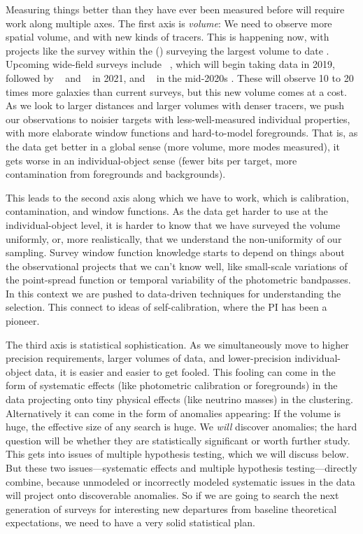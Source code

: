 \documentclass[12pt, fullpage, letterpaper]{article}
\begin{document}
Measuring things better than they have ever been measured before will require work along
multiple axes.
The first axis is \emph{volume}: We need to observe more spatial volume, and with new kinds
of tracers.
This is happening now, with projects like the
 survey within the  (\SDSSIV) surveying the largest volume to date
\citep{Dawson2015}.
Upcoming wide-field surveys include \DESI\ 
\citep{Aghamousa2016}, which will begin taking data in 2019, followed
by \NASA\ \project{Euclid} \citep{Amiaux2012} and
\LSST\ \citep{Ivezic2018} in 2021, and \NASA\  in the mid-2020s
\citep{Akeson2019}.
These will observe 10 to 20 times more galaxies than current surveys,
but this new volume comes at a cost. As we look to larger
distances and larger volumes with denser tracers, we push our
observations to noisier targets with less-well-measured individual
properties, with more elaborate window functions and hard-to-model foregrounds.
That is, as the data get better in a global sense (more volume, more
modes measured), it gets worse in an individual-object sense (fewer
bits per target, more contamination from foregrounds and backgrounds).

This leads to the second axis along which we have to work, which
is calibration, contamination, and window functions.
As the data get harder to use at the individual-object level, it is
harder to know that we have surveyed the volume uniformly, or, more
realistically, that we understand the non-uniformity of our sampling.
Survey window function knowledge starts to depend on things about the
observational projects that we can't know well, like small-scale
variations of the point-spread function or temporal variability of the
photometric bandpasses.
In this context we are pushed to data-driven techniques for
understanding the selection.
This connect to ideas of
self-calibration, where the PI has been a pioneer.

The third axis is statistical sophistication.
As we simultaneously move to higher precision requirements, larger
volumes of data, and lower-precision individual-object data, it is 
easier and easier to get fooled.
This fooling can come in the form of systematic effects (like
photometric calibration or foregrounds) in the data projecting onto
tiny physical effects (like neutrino masses) in the clustering.
Alternatively it can come in the form of anomalies appearing: If the volume is
huge, the effective size of any search is huge.
We \emph{will} discover anomalies; the hard question will be whether
they are statistically significant or worth further study.
This gets into issues of multiple hypothesis testing, which we will
discuss below.
But these two issues---systematic effects and multiple hypothesis
testing---directly combine, because unmodeled or incorrectly modeled
systematic issues in the data will project onto discoverable
anomalies.
So if we are going to search the next generation of surveys for
interesting new departures from baseline theoretical expectations,
we need to have a very solid statistical plan.
\end{document}
